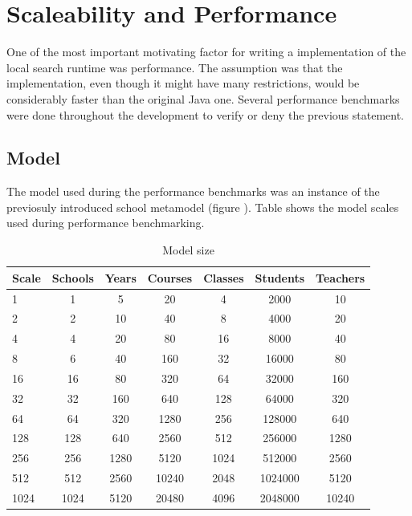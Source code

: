 \chapter{Scaleability and Performance}

One of the most important motivating factor for writing a \CPP{} implementation
of the local search runtime was performance. The assumption was that the \CPP{}
implementation, even though it might have many restrictions, would be
considerably faster than the original Java one. Several performance benchmarks
were done throughout the development to verify or deny the previous statement.

\section{Model}

The model used during the performance benchmarks was an instance of the
previosuly introduced school metamodel (figure ).
Table  shows the model scales used during performance
benchmarking.

\begin{table}[ht]
	\footnotesize
	\centering
	\caption{Model size}\label{tab:model_size}
	\begin{tabular}{ | l | c | c | c | c | c | c |}
	\hline
	Scale	& Schools	& Years & Courses	& Classes	& Students	& Teachers	\\ \hline
	1 		&  1		& 5		& 20		& 4			& 2000		& 10		\\
	2 		&  2		& 10	& 40		& 8			& 4000		& 20		\\
	4		&  4		& 20	& 80		& 16		& 8000		& 40		\\
	8		&  6		& 40	& 160		& 32		& 16000		& 80		\\
	16 		&  16		& 80	& 320		& 64 		& 32000		& 160		\\
	32		&  32		& 160	& 640		& 128 		& 64000		& 320		\\
	64 		&  64		& 320	& 1280		& 256 		& 128000	& 640		\\
	128 	&  128		& 640	& 2560		& 512		& 256000	& 1280		\\
	256 	&  256		& 1280	& 5120		& 1024		& 512000	& 2560		\\
	512		&  512		& 2560	& 10240		& 2048		& 1024000	& 5120		\\
	1024	&  1024		& 5120	& 20480		& 4096		& 2048000	& 10240		\\
	\hline
	\end{tabular}
	\label{tab:TabularExample}
\end{table}

